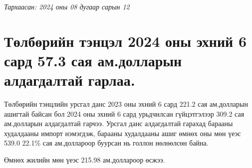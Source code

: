 ﻿
\begin{flushright}
    \textit{Тархаасан: 2024 оны 08 дугаар сарын 12} %
\end{flushright}


\section*{Төлбөрийн тэнцэл 2024 оны эхний 6 сард 57.3 сая
ам.долларын алдагдалтай гарлаа.}

Төлбөрийн тэнцлийн урсгал данс 2023 оны эхний 6 сард 221.2 сая
ам.долларын ашигтай байсан бол 2024 оны эхний 6 сард урьдчилсан
гүйцэтгэлээр 309.2 сая ам.долларын алдагдалтай гарчээ. Урсгал данс алдагдалтай гарахад
барааны худалдааны импорт нэмэгдэж, барааны худалдааны ашиг өмнөх оны мөн үеэс 539.0
22.1\% сая ам.доллароор буурсан нь голлон нөлөөлсөн байна.

Өмнөх жилийн мөн үеэс 215.98 ам.доллароор өсжээ. 